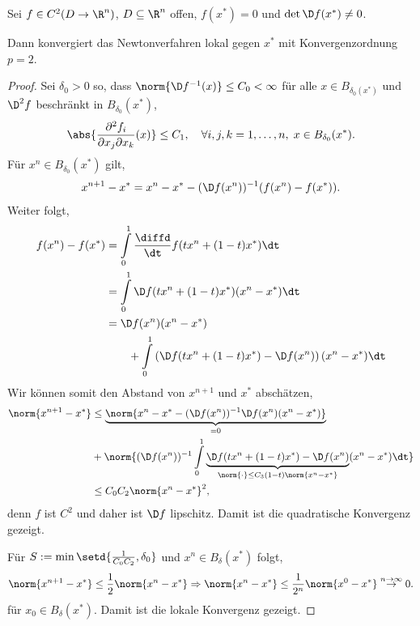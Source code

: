 \begin{prop}
\label{prop:5.7}
Sei $f\in C^2(D\to\R^n)$, $D\subseteq \R^n$ offen, $f(x^*) = 0$ und $\det \D
f(x^*)\neq 0$.

Dann konvergiert das Newtonverfahren lokal gegen $x^*$ mit Konvergenzordnung
$p=2$.\fishhere
\end{prop}
\begin{proof}
Sei $\delta_0 > 0$ so, dass $\norm{\D f^{-1}(x)}\le C_0 < \infty$ für alle
$x\in B_{\delta_0(x^*)}$ und $\D^2 f$ beschränkt in $B_{\delta_0}(x^*)$,
\begin{align*}
\abs{\frac{\partial^2 f_i}{\partial x_j\partial x_k}(x)} \le C_1,\quad \forall
i,j,k = 1,\ldots,n,\; x\in B_{\delta_0}(x^*).
\end{align*}
Für $x^n\in B_{\delta_0}(x^*)$ gilt,
\begin{align*}
x^{n+1}-x^* = x^n - x^* - (\D f(x^n))^{-1}(f(x^n)-f(x^*)).
\end{align*}
Weiter folgt,
\begin{align*}
f(x^n)-f(x^*) &= \int\limits_0^1 \frac{\diffd}{\dt} f(tx^n + (1-t)x^*)\dt\\
&= \int\limits_{0}^1 \D f(tx^n+(1-t)x^*)(x^n-x^*)\dt\\
&= \D f(x^n)(x^n-x^*) \\ &\qquad+ \int\limits_0^1 \left(\D f(tx^n+(1-t)x^*)-\D
f(x^n)\right)(x^n-x^*)\dt
\end{align*}
Wir können somit den Abstand von $x^{n+1}$ und $x^*$ abschätzen,
\begin{align*}
\norm{x^{n+1}-x^*} &\le \underbrace{\norm{x^n-x^* - (\D f(x^n))^{-1}\D
f(x^n)(x^n-x^*)}}_{=0}\\
&+ \norm{(\D f(x^{n}))^{-1}\int\limits_0^1\underbrace{\D
f(tx^n+(1-t)x^*)-\D f(x^n)}_{\norm{\cdot}\le
C_3(1-t)\norm{x^n-x^*}}(x^n-x^*)\dt}\\ &\le C_0 C_2 \norm{x^n-x^*}^2,
\end{align*}
denn $f$ ist $C^2$ und daher ist $\D f$ lipschitz. Damit ist die quadratische
Konvergenz gezeigt.

Für $S:=\min\setd{\frac{1}{C_0 C_2},\delta_0}$ und $x^n\in B_\delta(x^*)$ folgt,
\begin{align*}
\norm{x^{n+1}-x^*} \le \frac{1}{2}\norm{x^n-x^*}
\Rightarrow
\norm{x^n-x^*} \le \frac{1}{2^n}\norm{x^0-x^*} \overset{n\to\infty}{\to} 0.
\end{align*}
für $x_0\in B_\delta(x^*)$. Damit ist die lokale Konvergenz gezeigt.\qedhere
\end{proof}

